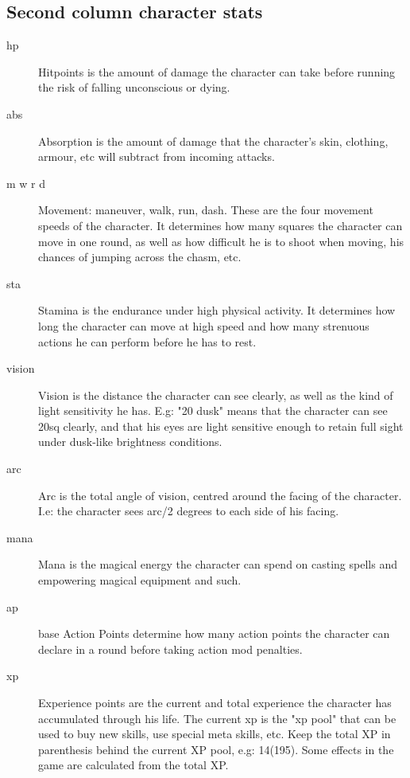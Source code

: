 \subsection*{Second column character stats}
\begin{description}

\item[hp] Hitpoints is the amount of damage the character can take before running the risk of falling unconscious or dying.

\item[abs] Absorption is the amount of damage that the character's skin, clothing, armour, etc will subtract from incoming attacks.

\item[m w r d] Movement: maneuver, walk, run, dash. These are the four movement speeds of the character. It determines how many squares the character can move in one round, as well as how difficult he is to shoot when moving, his chances of jumping across the chasm, etc.

\item[sta] Stamina is the endurance under high physical activity. It determines how long the character can move at high speed and how many strenuous actions he can perform before he has to rest.

\item[vision] Vision is the distance the character can see clearly, as well as the kind of light sensitivity he has. E.g: "20 dusk" means that the character can see 20sq clearly, and that his eyes are light sensitive enough to retain full sight under dusk-like brightness conditions.

\item[arc] Arc is the total angle of vision, centred around the facing of the character. I.e: the character sees arc/2 degrees to each side of his facing.

\item[mana] Mana is the magical energy the character can spend on casting spells and empowering magical equipment and such.

\item[ap] base Action Points determine how many action points the character can declare in a round before taking action mod penalties.

\item[xp] Experience points are the current and total experience the character has accumulated through his life. The current xp is the "xp pool" that can be used to buy new skills, use special meta skills, etc. Keep the total XP in parenthesis behind the current XP pool, e.g: 14(195). Some effects in the game are calculated from the total XP.

\end{description}

